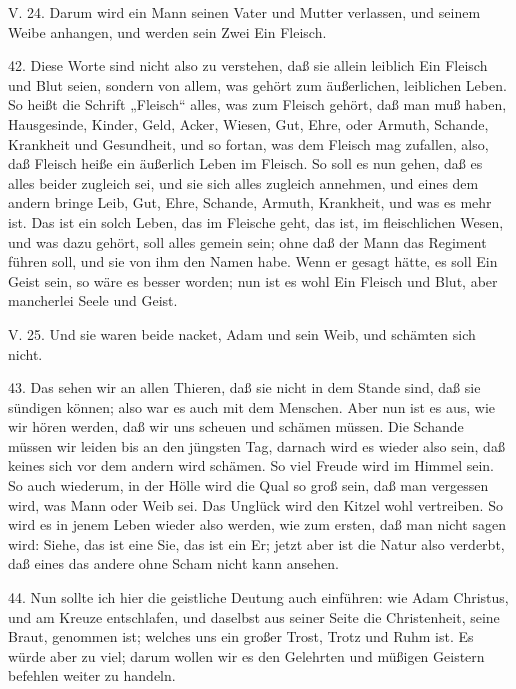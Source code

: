 \begin{schriftzitat}
V. 24. Darum wird ein Mann seinen Vater und Mutter verlassen, und seinem Weibe anhangen, und werden sein Zwei Ein Fleisch.
\end{schriftzitat}

42. Diese Worte sind nicht also zu verstehen, daß sie allein leiblich Ein Fleisch und Blut seien, sondern von allem, was gehört zum äußerlichen, leiblichen Leben. So heißt die Schrift „Fleisch“ alles, was zum Fleisch gehört, daß man muß haben, Hausgesinde, Kinder, Geld, Acker, Wiesen, Gut, Ehre, oder Armuth, Schande, Krankheit und Gesundheit, und so fortan, was dem Fleisch mag zufallen, also, daß Fleisch heiße ein äußerlich Leben im Fleisch. So soll es nun gehen, daß es alles beider zugleich sei, und sie sich alles zugleich annehmen, und eines dem andern bringe Leib, Gut, Ehre, Schande, Armuth, Krankheit, und was es mehr ist. Das ist ein solch Leben, das im Fleische geht, das ist, im fleischlichen Wesen, und was dazu gehört, soll alles gemein sein; ohne daß der Mann das Regiment führen soll, und sie von ihm den Namen habe. Wenn er gesagt hätte, es soll Ein Geist sein, so wäre es besser worden; nun ist es wohl Ein Fleisch und Blut, aber mancherlei Seele und Geist.

\begin{schriftzitat}
V. 25. Und sie waren beide nacket, Adam und sein Weib, und schämten sich nicht.
\end{schriftzitat}

43. Das sehen wir an allen Thieren, daß sie nicht in dem Stande sind, daß sie sündigen können; also war es auch mit dem Menschen. Aber nun ist es aus, wie wir hören werden, daß wir uns scheuen und schämen müssen. Die Schande müssen wir leiden bis an den jüngsten Tag, darnach wird es wieder also sein, daß keines sich vor dem andern wird schämen. So viel Freude wird im Himmel sein. So auch wiederum, in der Hölle wird die Qual so groß sein, daß man vergessen wird, was Mann oder Weib sei. Das Unglück wird den Kitzel wohl vertreiben. So wird es in jenem Leben wieder also werden, wie zum ersten, daß man nicht sagen wird: Siehe, das ist eine Sie, das ist ein Er; jetzt aber ist die Natur also verderbt, daß eines das andere ohne Scham nicht kann ansehen.

44. Nun sollte ich hier die geistliche Deutung auch einführen: wie Adam Christus, und am Kreuze entschlafen, und daselbst aus seiner Seite die Christenheit, seine Braut, genommen ist; welches uns ein großer Trost, Trotz und Ruhm ist. Es würde aber zu viel; darum wollen wir es den Gelehrten und müßigen Geistern befehlen weiter zu handeln.

